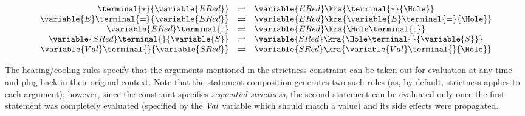 \documentclass{article}
\begin{document}
\[
\begin{array}{rcl}
{\terminal{*}{\variable{ERed}}}&\rightleftharpoons& {{\variable{ERed}}\kra {\terminal{*}{\Hole}}}
\\
{{\variable{E}} \terminal{=}{\variable{ERed}}}&\rightleftharpoons&{{\variable{ERed}}\kra {{\variable{E}} \terminal{=}{\Hole}}}
\\
{{\variable{ERed}} \terminal{;}}&\rightleftharpoons&{{\variable{ERed}}\kra {{\Hole}\terminal{;}}}
\\
{{\variable{SRed}} \terminal{}{\variable{S}}}&\rightleftharpoons&{{\variable{SRed}}\kra {{\Hole} \terminal{}{\variable{S}}}}
\\
{{\variable{Val}} \terminal{}{\variable{SRed}}}&\rightleftharpoons&{{\variable{SRed}}\kra { {\variable{Val}}\terminal{}{\Hole}}}
\end{array}
\]

The heating/cooling rules specify that the arguments mentioned in the strictness constraint can be taken out for evaluation at any time and plug back in their original context.  Note that the statement composition generates two such rules (as, by default, strictness applies to each argument);  however, since the constraint specifies {\em sequential strictness}, the second statement can be evaluated only once the first statement was completely evaluated (specified by the $\it Val$ variable which should match a value) and its side effects were propagated.
\end{document}
